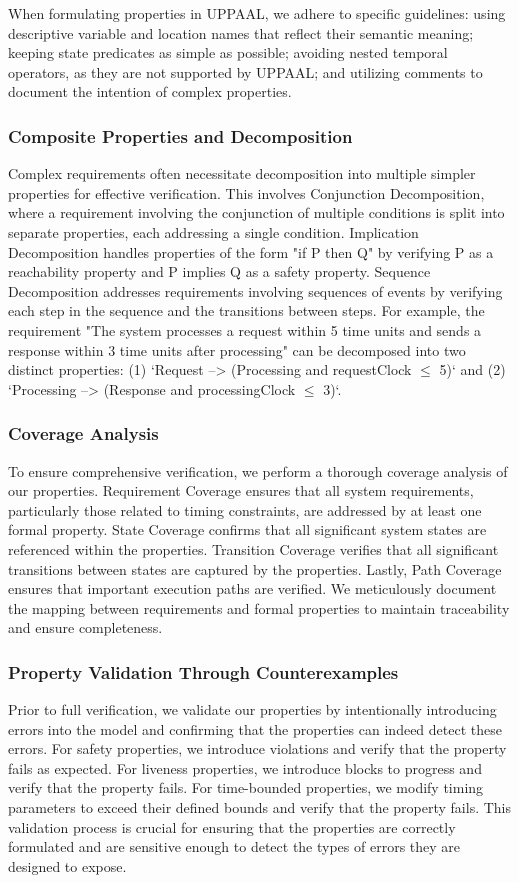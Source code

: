 When formulating properties in UPPAAL, we adhere to specific guidelines: using descriptive variable and location names that reflect their semantic meaning; keeping state predicates as simple as possible; avoiding nested temporal operators, as they are not supported by UPPAAL; and utilizing comments to document the intention of complex properties.

\subsubsection{Composite Properties and Decomposition}
Complex requirements often necessitate decomposition into multiple simpler properties for effective verification. This involves Conjunction Decomposition, where a requirement involving the conjunction of multiple conditions is split into separate properties, each addressing a single condition. Implication Decomposition handles properties of the form "if P then Q" by verifying P as a reachability property and P implies Q as a safety property. Sequence Decomposition addresses requirements involving sequences of events by verifying each step in the sequence and the transitions between steps. For example, the requirement "The system processes a request within 5 time units and sends a response within 3 time units after processing" can be decomposed into two distinct properties: (1) `Request --> (Processing and requestClock $\leq$ 5)` and (2) `Processing --> (Response and processingClock $\leq$ 3)`.

\subsubsection{Coverage Analysis}
To ensure comprehensive verification, we perform a thorough coverage analysis of our properties. Requirement Coverage ensures that all system requirements, particularly those related to timing constraints, are addressed by at least one formal property. State Coverage confirms that all significant system states are referenced within the properties. Transition Coverage verifies that all significant transitions between states are captured by the properties. Lastly, Path Coverage ensures that important execution paths are verified. We meticulously document the mapping between requirements and formal properties to maintain traceability and ensure completeness.

\subsubsection{Property Validation Through Counterexamples}
Prior to full verification, we validate our properties by intentionally introducing errors into the model and confirming that the properties can indeed detect these errors. For safety properties, we introduce violations and verify that the property fails as expected. For liveness properties, we introduce blocks to progress and verify that the property fails. For time-bounded properties, we modify timing parameters to exceed their defined bounds and verify that the property fails. This validation process is crucial for ensuring that the properties are correctly formulated and are sensitive enough to detect the types of errors they are designed to expose.

